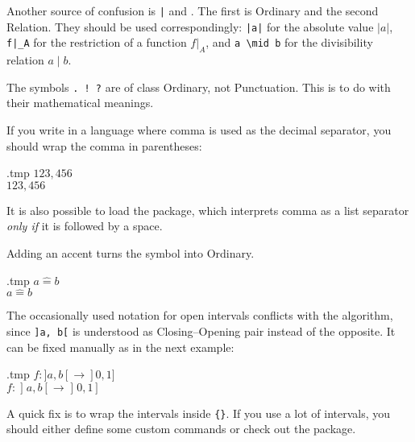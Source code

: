 \begin{gotcha}
Another source of confusion is \verb.|. and .
The first is Ordinary and the second Relation.
They should be used correspondingly:
\verb.|a|. for the absolute value $|a|$,
\verb.f|_A. for the restriction of a function $f|_A$,
and \verb.a \mid b. for the divisibility relation $a \mid b$.
\end{gotcha}

\begin{gotcha}
The symbols \verb|. ! ?| are of class Ordinary, not Punctuation.
This is to do with their mathematical meanings.
\end{gotcha}

\begin{gotcha}
If you write in a language where comma is used as the decimal separator,
you should wrap the comma in parentheses:
%
\begin{VerbatimOut}{\jobname.tmp}
$123,456$\\
$123{,}456$
\end{VerbatimOut}
\ShowExample
%
It is also possible to load the  package,
which interprets comma as a list separator \emph{only if} it is followed by a space.
\end{gotcha}

\begin{gotcha}
Adding an accent turns the symbol into Ordinary.
%
\begin{VerbatimOut}{\jobname.tmp}
$a \hat= b$\\
$a \mathrel{\hat=} b$
\end{VerbatimOut}
\ShowExample
\end{gotcha}

\begin{gotcha}
The occasionally used notation for open intervals conflicts with the algorithm,
since \verb|]a, b[| is understood as Closing--Opening pair instead of the opposite.
It can be fixed manually as in the next example:
%
\begin{VerbatimOut}{\jobname.tmp}
$f \colon ]a, b[ \to ]0, 1]$\\
$f \colon \mathopen]a, b\mathclose[
    \to \mathopen]0, 1]$
\end{VerbatimOut}
\ShowExample
%
A quick fix is to wrap the intervals inside \verb|{}|.
If you use a lot of intervals,
you should either define some custom commands or check out the  package.
\end{gotcha}



